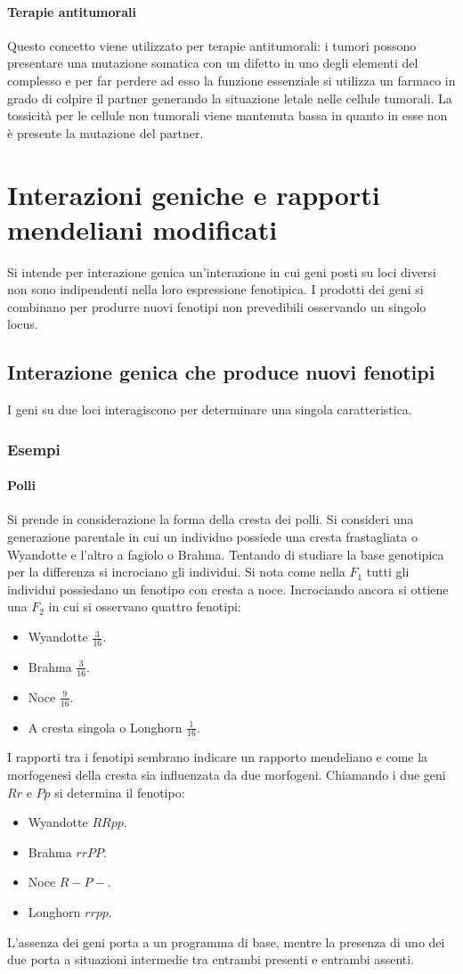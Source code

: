 \paragraph{Terapie antitumorali}
Questo concetto viene utilizzato per terapie antitumorali: i tumori possono presentare una
mutazione somatica con un difetto in uno degli elementi del complesso e per far perdere ad esso la funzione essenziale si utilizza un farmaco in grado di colpire il partner generando
la situazione letale nelle cellule tumorali. La tossicit\`a per le cellule non tumorali viene mantenuta bassa in quanto in esse non \`e presente la mutazione del partner. 
\section{Interazioni geniche e rapporti mendeliani modificati}
Si intende per interazione genica un'interazione in cui geni posti su loci diversi non sono indipendenti nella loro espressione fenotipica. I prodotti dei geni si combinano per produrre nuovi fenotipi
non prevedibili osservando un singolo locus.
\subsection{Interazione genica che produce nuovi fenotipi}
I geni su due loci interagiscono per determinare una singola caratteristica.
\subsubsection{Esempi}
\paragraph{Polli}
Si prende in considerazione la forma della cresta dei polli. Si consideri una generazione parentale in cui un individuo possiede una cresta frastagliata o Wyandotte e l'altro a fagiolo
o Brahma. Tentando di studiare la base genotipica per la differenza si incrociano gli individui. Si nota come nella $F_1$ tutti gli individui possiedano un fenotipo con cresta a noce. 
Incrociando ancora si ottiene una $F_2$ in cui si osservano quattro fenotipi:
\begin{itemize}
	\item Wyandotte $\frac{3}{16}$.
	\item Brahma $\frac{3}{16}$.
	\item Noce $\frac{9}{16}$.
	\item A cresta singola o Longhorn $\frac{1}{16}$.
\end{itemize}
I rapporti tra i fenotipi sembrano indicare un rapporto mendeliano e come la morfogenesi della cresta sia influenzata da due morfogeni. Chiamando i due geni $Rr$ e $Pp$ si determina il
fenotipo:
\begin{itemize}
	\item Wyandotte $RRpp$.
	\item Brahma $rrPP$.
	\item Noce $R-P-$.
	\item Longhorn $rrpp$.
\end{itemize}
L'assenza dei geni porta a un programma di base, mentre la presenza di uno dei due porta a situazioni intermedie tra entrambi presenti e entrambi assenti. 
